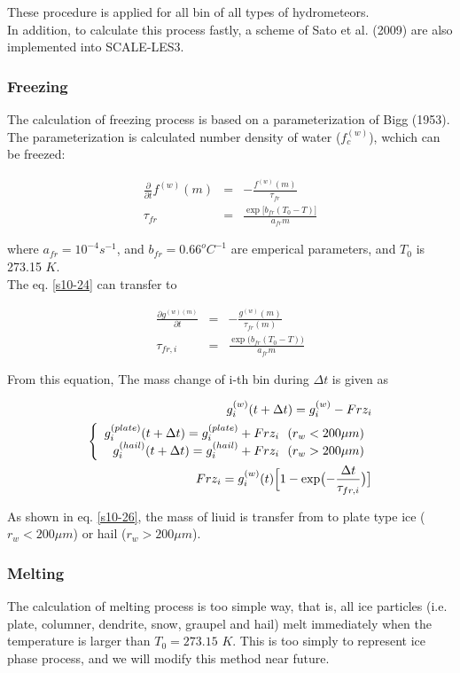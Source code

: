 These procedure is applied for all bin of all types of hydrometeors.\\
In addition, to calculate this process fastly, a scheme of Sato et al. (2009) are also implemented into SCALE-LES3.

\subsubsection{Freezing}
The calculation of freezing process is based on a parameterization of Bigg (1953). The parameterization is calculated number density of water ($f_{c}^{(w)}$), wchich can be freezed:

\begin{eqnarray}
\frac{\partial}{\partial t}f^{(w)}(m)&=&-\frac{f^{(w)}(m)}{\tau_{fr}}\label{s10-24}\\
\tau_{fr}&=&\frac{\exp \bigl[b_{fr}(T_{0}-T)\bigr]}{a_{fr} m}\nonumber
\end{eqnarray}

where $a_{fr}=10^{-4}s^{-1}$, and $b_{fr}=0.66^{o}C^{-1}$ are emperical parameters, and $T_{0}$ is 273.15 $K$.\\
The eq. \ref{s10-24} can transfer to

\begin{eqnarray}
\frac{\partial g^{(w)(m)}}{\partial t}&=&-\frac{g^{(w)}(m)}{\tau_{fr}(m)}\label{s10-25}\\
\tau_{fr,i}&=&\frac{\exp\bigl (b_{fr}(T_{0}-T)\bigr )}{a_{fr}m}\nonumber
\end{eqnarray}

From this equation, The mass change of i-th bin during $\Delta t$ is given as

\begin{eqnarray}
g_{i}^{(w)}(t+\Delta t)=g_{i}^{(w)}-Frz_{i}\label{s10-25}\\
\left \{
\begin{array}{r}
g_{i}^{(plate)}(t+\Delta t)=g_{i}^{(plate)}+Frz_{i}\:\:\: (r_{w}<200\mu m)\\
g_{i}^{(hail)}(t+\Delta t)=g_{i}^{(hail)}+Frz_{i}\:\:\: (r_{w}>200\mu m)
\end{array} \right.\label{s10-26}\\
Frz_{i}=g_{i}^{(w)}(t)\Bigl [1-\exp\bigl (-\frac{\Delta t}{\tau_{fr,i}}\bigr )\bigr]\nonumber
\end{eqnarray}


 As shown in eq. \ref{s10-26}, the mass of liuid is transfer from to plate type ice ($r_{w}<200\mu m$) or hail ($r_{w}>200\mu m$).

\subsubsection{Melting}
The calculation of melting process is too simple way, that is, all ice particles (i.e. plate, columner, dendrite, snow, graupel and hail) melt immediately when the temperature is larger than $T_{0}=273.15$ $K$. This is too simply to represent ice phase process, and we will modify this method near future.

